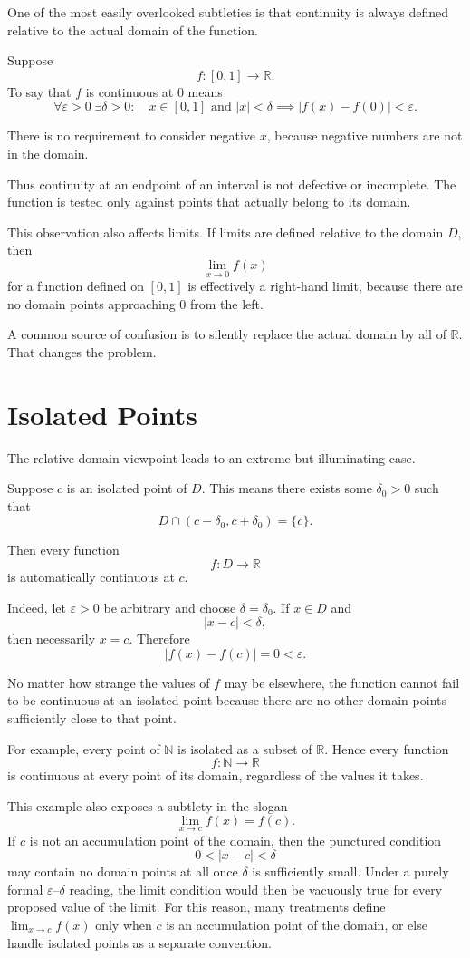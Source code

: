 \documentclass{essay}
\begin{document}
One of the most easily overlooked subtleties is that continuity is always defined relative to the actual domain of the function.

Suppose
\[
f:[0,1]\to\mathbb R.
\]
To say that $f$ is continuous at $0$ means
\[
\forall\varepsilon>0\;\exists\delta>0:
\quad
x\in[0,1]
\text{ and }
|x|<\delta
\implies
|f(x)-f(0)|<\varepsilon.
\]

There is no requirement to consider negative $x$, because negative numbers are not in the domain.

Thus continuity at an endpoint of an interval is not defective or incomplete. The function is tested only against points that actually belong to its domain.

This observation also affects limits. If limits are defined relative to the domain $D$, then
\[
\lim_{x\to 0}f(x)
\]
for a function defined on $[0,1]$ is effectively a right-hand limit, because there are no domain points approaching $0$ from the left.

A common source of confusion is to silently replace the actual domain by all of $\mathbb R$. That changes the problem.

\section{Isolated Points}

The relative-domain viewpoint leads to an extreme but illuminating case.

Suppose $c$ is an isolated point of $D$. This means there exists some $\delta_0>0$ such that
\[
D\cap(c-\delta_0,c+\delta_0)=\{c\}.
\]

Then every function
\[
f:D\to\mathbb R
\]
is automatically continuous at $c$.

Indeed, let $\varepsilon>0$ be arbitrary and choose $\delta=\delta_0$. If $x\in D$ and
\[
|x-c|<\delta,
\]
then necessarily $x=c$. Therefore
\[
|f(x)-f(c)|=0<\varepsilon.
\]

No matter how strange the values of $f$ may be elsewhere, the function cannot fail to be continuous at an isolated point because there are no other domain points sufficiently close to that point.

For example, every point of $\mathbb N$ is isolated as a subset of $\mathbb R$. Hence every function
\[
f:\mathbb N\to\mathbb R
\]
is continuous at every point of its domain, regardless of the values it takes.

This example also exposes a subtlety in the slogan
\[
\lim_{x\to c}f(x)=f(c).
\]
If $c$ is not an accumulation point of the domain, then the punctured condition
\[
0<|x-c|<\delta
\]
may contain no domain points at all once $\delta$ is sufficiently small. Under a purely formal $\varepsilon$--$\delta$ reading, the limit condition would then be vacuously true for every proposed value of the limit. For this reason, many treatments define $\lim_{x\to c}f(x)$ only when $c$ is an accumulation point of the domain, or else handle isolated points as a separate convention.
\end{document}
